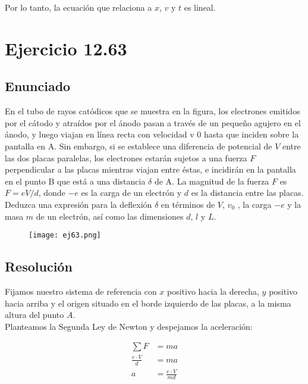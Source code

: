 \documentclass[11pt]{article}
\begin{document}
Por lo tanto, la ecuación que relaciona a $x$, $v$ y $t$ es lineal.


\newpage
\section*{Ejercicio 12.63}

\subsection*{Enunciado}

En el tubo de rayos catódicos que se muestra en la figura, los electrones 
emitidos por el cátodo y atraídos por el ánodo pasan a través de
un pequeño agujero en el ánodo, y luego viajan en línea recta con velocidad
v 0 hasta que inciden sobre la pantalla en A. Sin embargo, si se establece una
diferencia de potencial de $V$ entre las dos placas paralelas, los electrones 
estarán sujetos a una fuerza $F$ perpendicular a las placas mientras viajan entre
éstas, e incidirán en la pantalla en el punto B que está a una distancia $\delta$ 
de A. La magnitud de la fuerza $F$ es $F = eV/d$, donde $-e$ es la carga de un 
electrón y $d$ es la distancia entre las placas. Deduzca una expresión para la 
deflexión $\delta$ en términos de $V$, $v_0$ , la carga $-e$ y la masa $m$ de un 
electrón, así como las dimensiones $d$, $l$ y $L$.

\begin{figure}[h!]
  \begin{center}
    \texttt{[image: ej63.png]}
  \end{center}
\end{figure}


\subsection*{Resolución}

Fijamos nuestro sistema de referencia con $x$ positivo hacia la derecha, $y$
positivo hacia arriba y el origen situado en el borde izquierdo de las placas, a 
la misma altura del punto $A$. \\

Planteamos la Segunda Ley de Newton y despejamos la aceleración:

\begin{align*}
  \sum F &= m a \\
  \frac{e \cdot V}{d} &= m a \\
  a &= \frac{e \cdot V}{md}
\end{align*}
\end{document}
